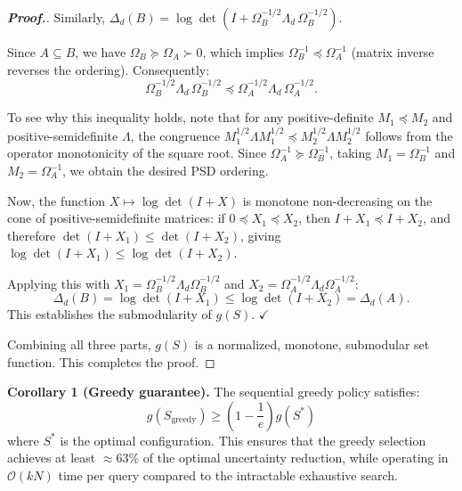 \documentclass[12pt,a4paper,oneside]{report}
\theoremstyle{definition}
\theoremstyle{remark}
\begin{document}
\begin{proof}[\textbf{Proof.}]
Similarly, $\Delta_d(B) = \log \det\left(I + \Omega_B^{-1/2} \Lambda_d \, \Omega_B^{-1/2}\right)$.

Since $A \subseteq B$, we have $\Omega_B \succeq \Omega_A \succ 0$, which implies $\Omega_B^{-1} \preceq \Omega_A^{-1}$ (matrix inverse reverses the ordering). Consequently:
\[
\Omega_B^{-1/2} \Lambda_d \, \Omega_B^{-1/2} \preceq \Omega_A^{-1/2} \Lambda_d \, \Omega_A^{-1/2}.
\]

To see why this inequality holds, note that for any positive-definite $M_1 \preceq M_2$ and positive-semidefinite $\Lambda$, the congruence $M_1^{1/2} \Lambda M_1^{1/2} \preceq M_2^{1/2} \Lambda M_2^{1/2}$ follows from the operator monotonicity of the square root. Since $\Omega_A^{-1} \succeq \Omega_B^{-1}$, taking $M_1 = \Omega_B^{-1}$ and $M_2 = \Omega_A^{-1}$, we obtain the desired PSD ordering.

Now, the function $X \mapsto \log \det(I + X)$ is monotone non-decreasing on the cone of positive-semidefinite matrices: if $0 \preceq X_1 \preceq X_2$, then $I + X_1 \preceq I + X_2$, and therefore $\det(I + X_1) \leq \det(I + X_2)$, giving $\log \det(I + X_1) \leq \log \det(I + X_2)$.

Applying this with $X_1 = \Omega_B^{-1/2} \Lambda_d \Omega_B^{-1/2}$ and $X_2 = \Omega_A^{-1/2} \Lambda_d \Omega_A^{-1/2}$:
\[
\Delta_d(B) = \log \det(I + X_1) \leq \log \det(I + X_2) = \Delta_d(A).
\]
This establishes the submodularity of $g(S)$. $\checkmark$

\medskip
Combining all three parts, $g(S)$ is a normalized, monotone, submodular set function. This completes the proof.
\end{proof}

\textbf{Corollary 1 (Greedy guarantee).} The sequential greedy policy satisfies:
\begin{equation} \label{eq:greedy_bound}
g(S_{\text{greedy}}) \geq \left(1 - \frac{1}{e}\right) g(S^*)
\end{equation}
where $S^*$ is the optimal configuration. This ensures that the greedy selection achieves at least $\approx 63\%$ of the optimal uncertainty reduction, while operating in $\mathcal{O}(kN)$ time per query compared to the intractable exhaustive search.
\end{document}
